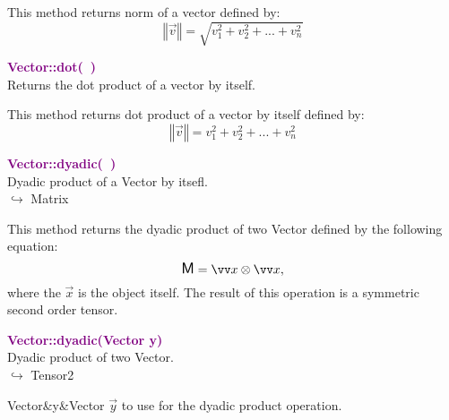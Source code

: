 This method returns norm of a vector defined by:
\begin{equation*}
\left\Vert \overrightarrow{v} \right\Vert = \sqrt {v_{1}^2 + v_{2}^2 + ... + v_{n}^2}
\end{equation*}

\textcolor{purple}{\textbf{Vector::dot(~)}}\label{Vector::dot()}\\
Returns the dot product of a vector by itself.

This method returns dot product of a vector by itself defined by:
\begin{equation*}
 \left\Vert \overrightarrow{v} \right\Vert  = v_{1}^2 + v_{2}^2 + ... + v_{n}^2
\end{equation*}

\textcolor{purple}{\textbf{Vector::dyadic(~)}}\label{Vector::dyadic()}\\
Dyadic product of a Vector by itsefl.\\ \hspace*{10mm}$\hookrightarrow$ Matrix

This method returns the dyadic product of two Vector defined by the following equation:
\begin{equation*}
\M = \overrightarrow{x}\otimes\overrightarrow{x},
\end{equation*}
where the $\overrightarrow{x}$ is the object itself. The result of this operation is a symmetric second order tensor.

\textcolor{purple}{\textbf{Vector::dyadic(Vector y)}}\label{Vector::dyadic(Vector y)}\\
Dyadic product of two Vector.\\ \hspace*{10mm}$\hookrightarrow$ Tensor2

\begin{tcolorbox}[width=\textwidth,myArgs,tabularx={ll|R}]
Vector&y&Vector $\overrightarrow{y}$ to use for the dyadic product operation.
\end{tcolorbox}

